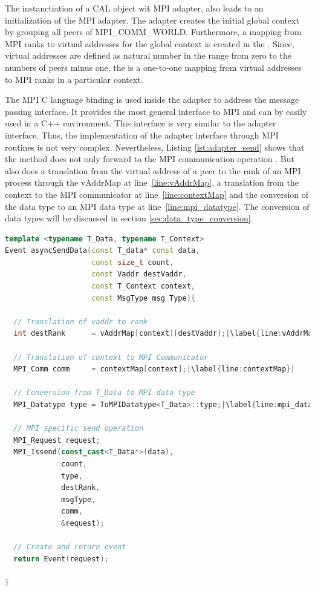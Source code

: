 The instanctiation of a CAL object wit MPI adapter, also leads to an
initialization of the MPI adapter. The adapter creates the initial
global context by grouping all peers of MPI\_COMM\_WORLD.
Furthermore, a mapping from MPI ranks to virtual addresses for the
global context is created in the . Since, virtual
addresses are defined as natural number in the range from zero to the
numbers of peers minus one, the  is a one-to-one mapping
from virtual addresses to MPI ranks in a particular context.


The MPI C language binding is used inside the adapter to address the
message passing interface.  It provides the most general interface to
MPI and can by easily used in a C++ environment.  This interface is
very similar to the adapter interface. Thus, the implementation of the
adapter interface through MPI routines is not very
complex. Nevertheless, Listing \ref{lst:adapter_send} shows that the
 method does not only forward to the MPI
communication operation .  But also does a translation
from the virtual address  of a peer to the rank of an
MPI process through the vAddrMap at line~\ref{line:vAddrMap}, a
translation from the context to the MPI communicator at
line~\ref{line:contextMap} and the conversion of the data type
 to an MPI data type at line~\ref{line:mpi_datatype}.  The
conversion of data types will be discussed in section
\ref{sec:data_type_conversion}.


\begin{lstlisting}[language=C++, breaklines=false, label={lst:adapter_send},escapechar=|]
template <typename T_Data, typename T_Context>      
Event asyncSendData(const T_data* const data, 
                    const size_t count, 
                    const Vaddr destVaddr, 
                    const T_Context context, 
                    const MsgType msg Type){    

  // Translation of vaddr to rank
  int destRank      = vAddrMap[context][destVaddr];|\label{line:vAddrMap}|

  // Translation of context to MPI Communicator
  MPI_Comm comm     = contextMap[context];|\label{line:contextMap}|

  // Conversion from T_Data to MPI data type
  MPI_Datatype type = ToMPIDatatype<T_Data>::type;|\label{line:mpi_datatype}|

  // MPI specific send operation                                                                            
  MPI_Request request; 
  MPI_Issend(const_cast<T_Data*>(data), 
             count, 
             type,
             destRank, 
             msgType,
             comm,
             &request);

  // Create and return event
  return Event(request);                                                                                                       

}  
\end{lstlisting}

